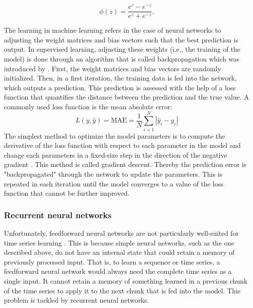 \begin{equation} \label{Eq:activation}
    \phi(z)=\frac{e^z-e^{-z}}{e^z+e^{-z}}.
\end{equation}

The learning in machine learning refers in the case of neural networks to adjusting the weight matrices and bias vectors such that the best prediction is output. In supervised learning, adjusting these weights (i.e., the training of the model) is done through an algorithm that is called backpropagation which was introduced by \citet{Rumelhart:1986}. First, the weight matrices and bias vectors are randomly initialized. Then, in a first iteration, the training data is fed into the network, which outputs a prediction. This prediction is assessed with the help of a loss function that quantifies the distance between the prediction and the true value. A commonly used loss function is the mean absolute error:
%
\begin{equation} \label{Eq:lossMAE}
    L\left(y, \widehat{y}\right)=\text{MAE}=\frac{1}{N}\sum_{i=1}^N\left|\widehat{y}_i-y_i\right|
\end{equation}
%
The simplest method to optimize the model parameters is to compute the derivative of the loss function with respect to each parameter in the model and change each parameters in a fixed-size step in the direction of the negative gradient \citep{Graves:2013}. This method is called gradient descent. Thereby the prediction error is "backpropagated" through the network to update the parameters. This is repeated in each iteration until the model converges to a value of the loss function that cannot be further improved.



\subsubsection{Recurrent neural networks}

Unfortunately, feedforward neural networks are not particularly well-suited for time series learning \citep{chollet:2018}. This is because simple neural networks, such as the one described above, do not have an internal state that could retain a memory of previously processed input. That is, to learn a sequence or time series, a feedforward neural network would always need the complete time series as a single input. It cannot retain a memory of something learned in a previous chunk of the time series to apply it to the next chunk that is fed into the model. This problem is tackled by recurrent neural networks.

